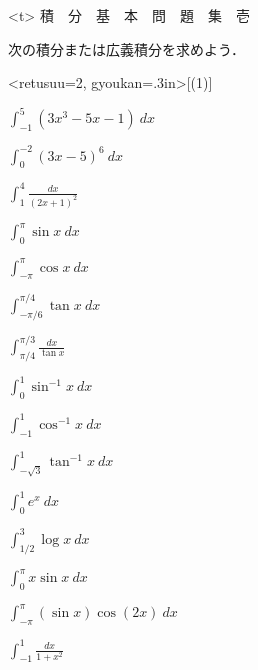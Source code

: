 \documentclass[11pt, uplatex, dvipdfmx]{jsarticle}
\newcommand{\ds}{\displaystyle}
\begin{document}
\thispagestyle{empty}


\begin{center}
  \pbox<t>{\Huge \hspace{1.5in} 積　分　基　本　問　題　集　壱}
\end{center}

\newpage

次の積分または広義積分を求めよう．

  \vspace{.2in}

  \begin{edaenumerate}<retusuu=2, gyoukan=.3in>[(1)]
    
  \item $\ds \int_{-1}^{5} \left( 3x^3-5x-1 \right) \ dx$
    
  \item $\ds \int_{0}^{-2} \left( 3x-5 \right)^6 \ dx$
    
  \item $\ds \int_{1}^{4} \frac{dx}{(2x+1)^2}$
    
  \item $\ds \int_{0}^{\pi} \sin x \ dx$
    
  \item $\ds \int_{-\pi}^{\pi} \cos x \ dx$

  \item $\ds \int_{-\pi /6}^{\pi /4} \tan x \ dx$

  \item $\ds \int_{\pi/4}^{\pi/3} \frac{dx}{\tan x}$

  \item $\ds \int_{0}^{1} \sin^{-1}x \ dx$

  \item $\ds \int_{-1}^{1} \cos^{-1}x \ dx$

  \item $\ds \int_{-\sqrt{3}}^{1} \tan^{-1}x \ dx$

  \item $\ds \int_0^1 e^x \ dx$

  \item $\ds \int_{1/2}^{3} \log x \ dx$

  \item $\ds \int_{0}^{\pi} x \sin x \ dx$

  \item $\ds \int_{-\pi}^{\pi} \left(\sin x\right) \cos \left(2x \right)\ dx$

  \item $\ds \int_{-1}^{1} \frac{dx}{1+x^2}$


\end{edaenumerate}
\end{document}
